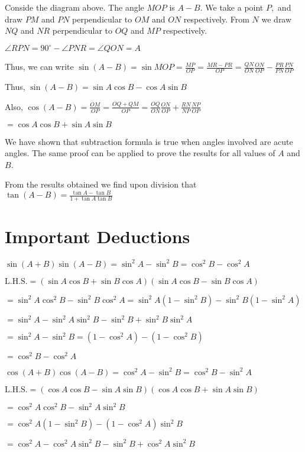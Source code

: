 Conside the diagram above. The angle $MOP$ is $A - B.$ We take a point $P,$ and draw $PM$ and $PN$
perpendicular to $OM$ and $ON$ respectively. From $N$ we draw $NQ$ and $NR$ perpendicular to
$OQ$ and $MP$ respectively.

$\angle RPN = 90^{\circ} - \angle PNR = \angle QON = A$

Thus, we can write $\sin(A - B) = \sin MOP = \frac{MP}{OP} = \frac{MR - PR}{OP} = \frac{QN}{ON}\frac{ON}{OP} -
\frac{PR}{PN}\frac{PN}{OP}$

Thus, $\sin(A - B) = \sin A\cos B - \cos A\sin B$

Also, $\cos(A - B) = \frac{OM}{OP} = \frac{OQ + QM}{OP} = \frac{OQ}{ON}\frac{ON}{OP} + \frac{RN}{NP}\frac{NP}{OP}$

$= \cos A\cos B + \sin A\sin B$

We have shown that subtraction formula is true when angles involved are acute angles. The same proof can be applied to prove the
results for all values of $A$ and $B$.

From the results obtained we find upon division that $\tan(A - B) = \frac{\tan A - \tan B}{1 + \tan A\tan B}$

\section{Important Deductions}
\startitemize[n]
\item $\sin(A + B)\sin(A - B) = \sin^2A - \sin^2B = \cos^2B - \cos^2A$

$\text{L.H.S.}= (\sin A\cos B + \sin B\cos A)(\sin A\cos B - \sin B\cos A)$

  $= \sin^2A\cos^2B - \sin^2B\cos^2A = \sin^2A(1 - \sin^2B) - \sin^2B(1 - \sin^2A)$

  $= \sin^2A - \sin^2A\sin^2B - \sin^2B + \sin^2B\sin^2A$

  $=\sin^2A - \sin^2B = (1 - \cos^2A) - (1 - \cos^2B)$

  $= \cos^2B - \cos^2A$

\item $\cos(A + B)\cos(A - B) = \cos^2A - \sin^2B = \cos^2B - \sin^2A$

$\text{L.H.S.} =(\cos A\cos B - \sin A\sin B)(\cos A\cos B + \sin A\sin B)$

  $= \cos^2A\cos^2B - \sin^2A\sin^2B$

  $= \cos^2A(1- \sin^2B) - (1 - \cos^2A)\sin^2B$

  $=\cos^2A - \cos^2A\sin^2B - \sin^2B + \cos^2A\sin^2B$

